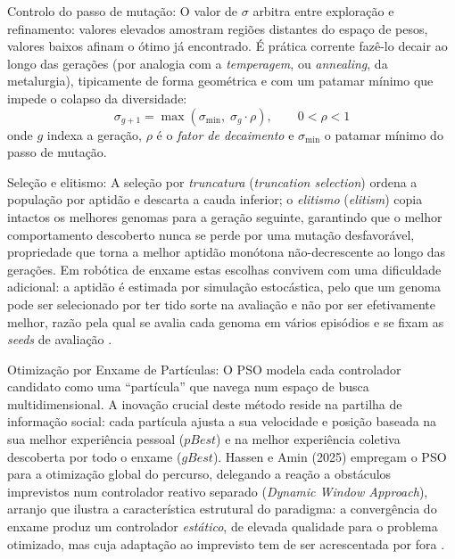 \documentclass[12pt,reqno, twoside]{amsbook}
\makeatletter
\def\paragraph{\@startsection{paragraph}{4}%
  \z@\z@{-\fontdimen2\font}%
  {\normalfont\bfseries}}
\theoremstyle{plain}
\numberwithin{equation}{chapter}
\numberwithin{section}{chapter}
\numberwithin{table}{chapter}
\numberwithin{figure}{chapter}
\makeatother
\begin{document}
\paragraph{Controlo do passo de mutação:}
O valor de $\sigma$ arbitra entre exploração e refinamento: valores elevados amostram regiões distantes do espaço de pesos, valores baixos afinam o ótimo já encontrado. É prática corrente fazê-lo decair ao longo das gerações (por analogia com a \emph{temperagem}, ou \textit{annealing}, da metalurgia), tipicamente de forma geométrica e com um patamar mínimo que impede o colapso da diversidade:
\begin{equation}
    \sigma_{g+1} = \max\!\left(\sigma_{\min},\; \sigma_g \cdot \rho\right), \qquad 0 < \rho < 1
    \label{eq:sigma_decay}
\end{equation}
onde $g$ indexa a geração, $\rho$ é o \emph{fator de decaimento} e $\sigma_{\min}$ o patamar mínimo do passo de mutação.

\paragraph{Seleção e elitismo:}
A seleção por \emph{truncatura} (\textit{truncation selection}) ordena a população por aptidão e descarta a cauda inferior; o \emph{elitismo} (\textit{elitism}) copia intactos os melhores genomas para a geração seguinte, garantindo que o melhor comportamento descoberto nunca se perde por uma mutação desfavorável, propriedade que torna a melhor aptidão monótona não-decrescente ao longo das gerações. Em robótica de enxame estas escolhas convivem com uma dificuldade adicional: a aptidão é estimada por simulação estocástica, pelo que um genoma pode ser selecionado por ter tido sorte na avaliação e não por ser efetivamente melhor, razão pela qual se avalia cada genoma em vários episódios e se fixam as \textit{seeds} de avaliação \cite{bredeche2022social, fontbonne2020online}.

\paragraph{Otimização por Enxame de Partículas:} O PSO modela cada controlador candidato como uma ``partícula'' que navega num espaço de busca multidimensional. A inovação crucial deste método reside na partilha de informação social: cada partícula ajusta a sua velocidade e posição baseada na sua melhor experiência pessoal ($pBest$) e na melhor experiência coletiva descoberta por todo o enxame ($gBest$). Hassen e Amin (2025) empregam o PSO para a otimização global do percurso, delegando a reação a obstáculos imprevistos num controlador reativo separado (\textit{Dynamic Window Approach}), arranjo que ilustra a característica estrutural do paradigma: a convergência do enxame produz um controlador \emph{estático}, de elevada qualidade para o problema otimizado, mas cuja adaptação ao imprevisto tem de ser acrescentada por fora \cite{hassen2025hybrid}.
\end{document}
